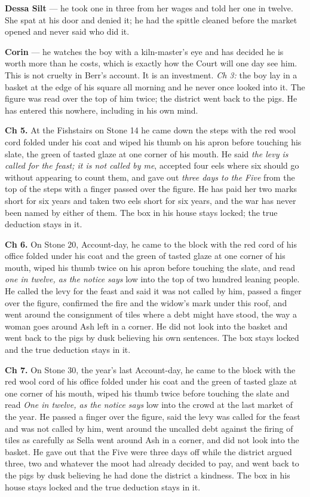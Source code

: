 \documentclass{design/chronicle}
\begin{document}
{\textbf{Dessa Silt} — he took one in three from her wages and told her one in twelve. She spat at his door and denied it; he had the spittle cleaned before the market opened and never said who did it.

\textbf{Corin} — he watches the boy with a kiln-master’s eye and has decided he is worth more than he costs, which is exactly how the Court will one day see him. This is not cruelty in Berr’s account. It is an investment. \emph{Ch 3:} the boy lay in a basket at the edge of his square all morning and he never once looked into it. The figure was read over the top of him twice; the district went back to the pigs. He has entered this nowhere, including in his own mind.

\textbf{Ch 5.} At the Fishstairs on Stone 14 he came down the steps with the red wool cord folded under his coat and wiped his thumb on his apron before touching his slate, the green of tasted glaze at one corner of his mouth. He said \emph{the levy is called for the feast; it is not called by me}, accepted four eels where six should go without appearing to count them, and gave out \emph{three days to the Five} from the top of the steps with a finger passed over the figure. He has paid her two marks short for six years and taken two eels short for six years, and the war has never been named by either of them. The box in his house stays locked; the true deduction stays in it.

\textbf{Ch 6.} On Stone 20, Account-day, he came to the block with the red cord of his office folded under his coat and the green of tasted glaze at one corner of his mouth, wiped his thumb twice on his apron before touching the slate, and read \emph{one in twelve, as the notice says} low into the top of two hundred leaning people. He called the levy for the feast and said it was not called by him, passed a finger over the figure, confirmed the fire and the widow’s mark under this roof, and went around the consignment of tiles where a debt might have stood, the way a woman goes around Ash left in a corner. He did not look into the basket and went back to the pigs by dusk believing his own sentences. The box stays locked and the true deduction stays in it.

\textbf{Ch 7.} On Stone 30, the year’s last Account-day, he came to the block with the red wool cord of his office folded under his coat and the green of tasted glaze at one corner of his mouth, wiped his thumb twice before touching the slate and read \emph{One in twelve, as the notice says} low into the crowd at the last market of the year. He passed a finger over the figure, said the levy was called for the feast and was not called by him, went around the uncalled debt against the firing of tiles as carefully as Sella went around Ash in a corner, and did not look into the basket. He gave out that the Five were three days off while the district argued three, two and whatever the moot had already decided to pay, and went back to the pigs by dusk believing he had done the district a kindness. The box in his house stays locked and the true deduction stays in it.

}
\end{document}
